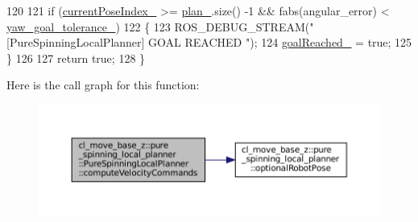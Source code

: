 \begin{DoxyCode}
120 
121   \textcolor{keywordflow}{if} (\hyperlink{classcl__move__base__z_1_1pure__spinning__local__planner_1_1PureSpinningLocalPlanner_aa0f9b4cf52a76e44dc2cfc5103d52dcd}{currentPoseIndex\_} >= \hyperlink{classcl__move__base__z_1_1pure__spinning__local__planner_1_1PureSpinningLocalPlanner_a31875ee78bae4698b579e20c0754860d}{plan\_}.size() -1 && fabs(angular\_error) < 
      \hyperlink{classcl__move__base__z_1_1pure__spinning__local__planner_1_1PureSpinningLocalPlanner_a07334cd7bf29f391c2553f0038fa94e8}{yaw\_goal\_tolerance\_})
122   \{
123     ROS\_DEBUG\_STREAM(\textcolor{stringliteral}{"[PureSpinningLocalPlanner] GOAL REACHED "});
124     \hyperlink{classcl__move__base__z_1_1pure__spinning__local__planner_1_1PureSpinningLocalPlanner_aecfe0dfc68b8c8e461e8b684e5fa4d2f}{goalReached\_} = \textcolor{keyword}{true};
125   \}
126 
127   \textcolor{keywordflow}{return} \textcolor{keyword}{true};
128 \}
\end{DoxyCode}
Here is the call graph for this function\+:
\nopagebreak
\begin{figure}[H]
\begin{center}
\leavevmode
\includegraphics[width=350pt]{classcl__move__base__z_1_1pure__spinning__local__planner_1_1PureSpinningLocalPlanner_af7dfee89a0a6c54569b5fd262ccbd4f0_cgraph}
\end{center}
\end{figure}
\mbox{\label{classcl__move__base__z_1_1pure__spinning__local__planner_1_1PureSpinningLocalPlanner_afc2d05b55e4a68932bbf8b4aabe9e219}} 

